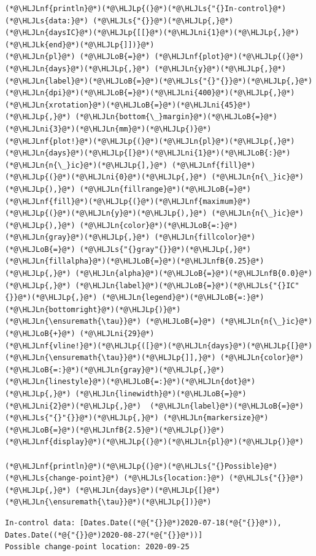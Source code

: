 \documentclass[12pt,a4paper]{article}
\newcommand{\HLJLk}[1]{\textcolor[RGB]{148,91,176}{\textbf{#1}}}
\newcommand{\HLJLn}[1]{#1}
\newcommand{\HLJLnf}[1]{\textcolor[RGB]{66,102,213}{#1}}
\newcommand{\HLJLs}[1]{\textcolor[RGB]{201,61,57}{#1}}
\newcommand{\HLJLnfB}[1]{\textcolor[RGB]{59,151,46}{#1}}
\newcommand{\HLJLni}[1]{\textcolor[RGB]{59,151,46}{#1}}
\newcommand{\HLJLoB}[1]{\textcolor[RGB]{102,102,102}{\textbf{#1}}}
\newcommand{\HLJLp}[1]{#1}
\begin{document}
\begin{lstlisting}
(*@\HLJLnf{println}@*)(*@\HLJLp{(}@*)(*@\HLJLs{"{}In-control}@*) (*@\HLJLs{data:}@*) (*@\HLJLs{"{}}@*)(*@\HLJLp{,}@*) (*@\HLJLn{daysIC}@*)(*@\HLJLp{[[}@*)(*@\HLJLni{1}@*)(*@\HLJLp{,}@*) (*@\HLJLk{end}@*)(*@\HLJLp{]])}@*)
(*@\HLJLn{pl}@*) (*@\HLJLoB{=}@*) (*@\HLJLnf{plot}@*)(*@\HLJLp{(}@*)(*@\HLJLn{days}@*)(*@\HLJLp{,}@*) (*@\HLJLn{y}@*)(*@\HLJLp{,}@*) (*@\HLJLn{label}@*)(*@\HLJLoB{=}@*)(*@\HLJLs{"{}"{}}@*)(*@\HLJLp{,}@*) (*@\HLJLn{dpi}@*)(*@\HLJLoB{=}@*)(*@\HLJLni{400}@*)(*@\HLJLp{,}@*) (*@\HLJLn{xrotation}@*)(*@\HLJLoB{=}@*)(*@\HLJLni{45}@*)(*@\HLJLp{,}@*) (*@\HLJLn{bottom{\_}margin}@*)(*@\HLJLoB{=}@*)(*@\HLJLni{3}@*)(*@\HLJLn{mm}@*)(*@\HLJLp{)}@*)
(*@\HLJLnf{plot!}@*)(*@\HLJLp{(}@*)(*@\HLJLn{pl}@*)(*@\HLJLp{,}@*) (*@\HLJLn{days}@*)(*@\HLJLp{[}@*)(*@\HLJLni{1}@*)(*@\HLJLoB{:}@*)(*@\HLJLn{n{\_}ic}@*)(*@\HLJLp{],}@*) (*@\HLJLnf{fill}@*)(*@\HLJLp{(}@*)(*@\HLJLni{0}@*)(*@\HLJLp{,}@*) (*@\HLJLn{n{\_}ic}@*)(*@\HLJLp{),}@*) (*@\HLJLn{fillrange}@*)(*@\HLJLoB{=}@*)(*@\HLJLnf{fill}@*)(*@\HLJLp{(}@*)(*@\HLJLnf{maximum}@*)(*@\HLJLp{(}@*)(*@\HLJLn{y}@*)(*@\HLJLp{),}@*) (*@\HLJLn{n{\_}ic}@*)(*@\HLJLp{),}@*) (*@\HLJLn{color}@*)(*@\HLJLoB{=:}@*)(*@\HLJLn{gray}@*)(*@\HLJLp{,}@*) (*@\HLJLn{fillcolor}@*) (*@\HLJLoB{=}@*) (*@\HLJLs{"{}gray"{}}@*)(*@\HLJLp{,}@*) (*@\HLJLn{fillalpha}@*)(*@\HLJLoB{=}@*)(*@\HLJLnfB{0.25}@*)(*@\HLJLp{,}@*) (*@\HLJLn{alpha}@*)(*@\HLJLoB{=}@*)(*@\HLJLnfB{0.0}@*)(*@\HLJLp{,}@*) (*@\HLJLn{label}@*)(*@\HLJLoB{=}@*)(*@\HLJLs{"{}IC"{}}@*)(*@\HLJLp{,}@*) (*@\HLJLn{legend}@*)(*@\HLJLoB{=:}@*)(*@\HLJLn{bottomright}@*)(*@\HLJLp{)}@*)
(*@\HLJLn{\ensuremath{\tau}}@*) (*@\HLJLoB{=}@*) (*@\HLJLn{n{\_}ic}@*) (*@\HLJLoB{+}@*) (*@\HLJLni{29}@*)
(*@\HLJLnf{vline!}@*)(*@\HLJLp{([}@*)(*@\HLJLn{days}@*)(*@\HLJLp{[}@*)(*@\HLJLn{\ensuremath{\tau}}@*)(*@\HLJLp{]],}@*) (*@\HLJLn{color}@*)(*@\HLJLoB{=:}@*)(*@\HLJLn{gray}@*)(*@\HLJLp{,}@*) (*@\HLJLn{linestyle}@*)(*@\HLJLoB{=:}@*)(*@\HLJLn{dot}@*)(*@\HLJLp{,}@*) (*@\HLJLn{linewidth}@*)(*@\HLJLoB{=}@*)(*@\HLJLni{2}@*)(*@\HLJLp{,}@*)  (*@\HLJLn{label}@*)(*@\HLJLoB{=}@*)(*@\HLJLs{"{}"{}}@*)(*@\HLJLp{,}@*) (*@\HLJLn{markersize}@*)(*@\HLJLoB{=}@*)(*@\HLJLnfB{2.5}@*)(*@\HLJLp{)}@*)
(*@\HLJLnf{display}@*)(*@\HLJLp{(}@*)(*@\HLJLn{pl}@*)(*@\HLJLp{)}@*)

(*@\HLJLnf{println}@*)(*@\HLJLp{(}@*)(*@\HLJLs{"{}Possible}@*) (*@\HLJLs{change-point}@*) (*@\HLJLs{location:}@*) (*@\HLJLs{"{}}@*)(*@\HLJLp{,}@*) (*@\HLJLn{days}@*)(*@\HLJLp{[}@*)(*@\HLJLn{\ensuremath{\tau}}@*)(*@\HLJLp{])}@*)
\end{lstlisting}

\begin{lstlisting}
In-control data: [Dates.Date((*@{"{}}@*)2020-07-18(*@{"{}}@*)), Dates.Date((*@{"{}}@*)2020-08-27(*@{"{}}@*))]
Possible change-point location: 2020-09-25
\end{lstlisting}
\end{document}
